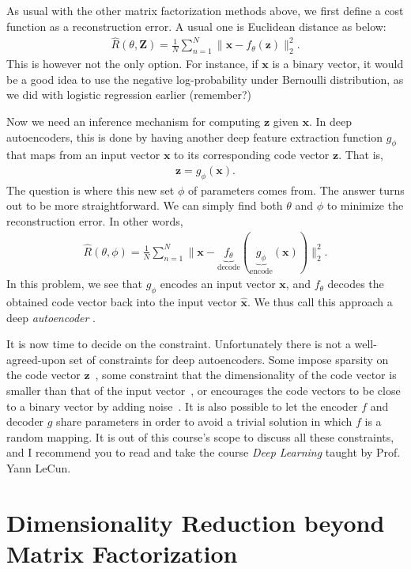 \documentclass{report}
\newcommand{\vect}[1]{\mathbf{#1}}
\newcommand{\matr}[1]{\mathbf{#1}}
\newcommand{\vx}[0]{\vect{x}}
\newcommand{\vz}[0]{\vect{z}}
\newcommand{\mZ}[0]{\matr{Z}}
\begin{document}
As usual with the other matrix factorization methods above, we first define a
cost function as a reconstruction error. A usual one is Euclidean distance as
below:
\begin{align*}
    \hat{R}(\theta, \mZ) = \frac{1}{N} \sum_{n=1}^N \| \vx - f_{\theta}(\vz) \|^2_2.
\end{align*}
This is however not the only option. For instance, if $\vx$ is a binary vector,
it would be a good idea to use the negative log-probability under Bernoulli
distribution, as we did with logistic regression earlier (remember?)  

Now we need an inference mechanism for computing $\vz$ given $\vx$. In deep
autoencoders, this is done by having another deep feature extraction function
$g_{\phi}$ that maps from an input vector $\vx$ to its corresponding code vector
$\vz$. That is,
\begin{align*}
    \vz = g_{\phi}(\vx).
\end{align*}
The question is where this new set $\phi$ of parameters comes from. The answer
turns out to be more straightforward. We can simply find both $\theta$ and
$\phi$ to minimize the reconstruction error. In other words,
\begin{align*}
    \hat{R}(\theta, \phi) = \frac{1}{N} \sum_{n=1}^N \| \vx -
    \underbrace{f_{\theta}}_{\text{decode}}(\underbrace{g_{\phi}}_{\text{encode}}(\vx)) \|^2_2.
\end{align*}
In this problem, we see that $g_{\phi}$ encodes an input vector $\vx$, and
$f_{\theta}$ decodes the obtained code vector back into the input vector
$\hat{\vx}$. We thus call this approach a deep {\it autoencoder}
\cite{hinton2006reducing}. 

It is now time to decide on the constraint. Unfortunately there is not a
well-agreed-upon set of constraints for deep autoencoders. Some impose sparsity
on the code vector $\vz$~\cite{cho2013simple}, some constraint that the
dimensionality of the code vector is smaller than that of the input
vector~\cite{hinton2006reducing}, or encourages the code vectors to be close to
a binary vector by adding noise~\cite{salakhutdinov2009semantic}. It is also
possible to let the encoder $f$ and decoder $g$ share parameters in order to
avoid a trivial solution in which $f$ is a random mapping. It is out of this
course's scope to discuss all these constraints, and I recommend you to read
\cite{goodfellow2016deep} and take the course {\it Deep Learning} taught by
Prof. Yann LeCun.


\section{Dimensionality Reduction beyond Matrix Factorization}
\end{document}
